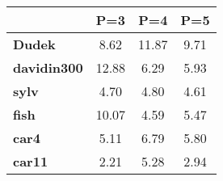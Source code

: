 \begin{tabular}{|l|c|c|c|}
\hline
&\textbf{P=3}&\textbf{P=4}&\textbf{P=5}\\\hline
\textbf{Dudek}&8.62&11.87&9.71\\\hline
\textbf{davidin300}&12.88&6.29&5.93\\\hline
\textbf{sylv}&4.70&4.80&4.61\\\hline
\textbf{fish}&10.07&4.59&5.47\\\hline
\textbf{car4}&5.11&6.79&5.80\\\hline
\textbf{car11}&2.21&5.28&2.94\\\hline
\end{tabular}
